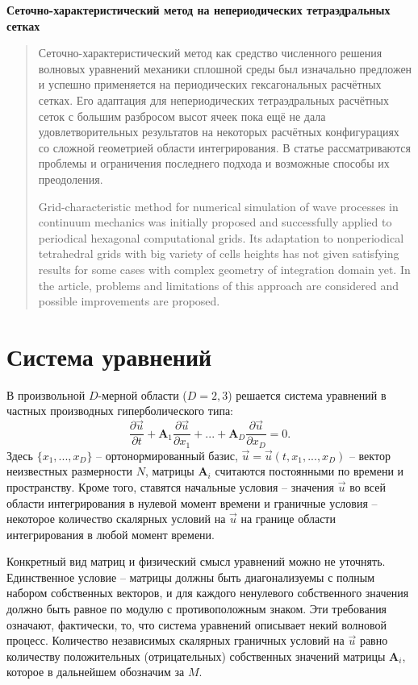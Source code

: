 \documentclass[a4paper]{article}
\numberwithin{equation}{section}
\begin{document}
\begin{center}
	\Large\textbf{{{Сеточно-характеристический метод на непериодических тетраэдральных сетках}}}
\end{center}

\begin{abstract}
Сеточно-характеристический метод как средство численного решения волновых уравнений 
механики сплошной среды был изначально предложен и успешно применяется на периодических 
гексагональных расчётных сетках. Его адаптация для непериодических тетраэдральных расчётных сеток 
с большим разбросом высот ячеек 
пока ещё не дала удовлетворительных результатов на некоторых  
расчётных конфигурациях со сложной геометрией области интегрирования. 
В статье рассматриваются проблемы и ограничения последнего подхода и возможные способы их преодоления.

Grid-characteristic method for numerical simulation of wave processes in continuum 
mechanics was initially proposed and successfully applied to periodical hexagonal 
computational grids. Its adaptation to nonperiodical tetrahedral grids 
with big variety of cells heights 
has not given satisfying results for some cases with complex geometry of 
integration domain yet. In the article, problems and limitations of this 
approach are considered and possible improvements are proposed.
\end{abstract}

\section{Система уравнений}
В произвольной $D$-мерной области ($D = 2, 3$) решается система уравнений 
в частных производных гиперболического типа:
\begin{equation}
\label{general_equation}
	\frac{\partial\vec{u}}{\partial{t}}+
	\mathbf{A}_1\frac{\partial\vec{u}}{\partial{x_1}}+...+
	\mathbf{A}_D\frac{\partial\vec{u}}{\partial{x_D}}=0.
\end{equation}
Здесь $\{x_1, ..., x_D\}$ -- ортонормированный базис, 
$\vec{u} = \vec{u}(t, x_1, ..., x_D)$ -- вектор неизвестных размерности $N$,
матрицы $\mathbf{A}_i$ считаются постоянными по времени и пространству.
Кроме того, ставятся начальные условия -- значения $\vec{u}$ 
во всей области интегрирования в нулевой момент времени и
граничные условия -- некоторое количество скалярных условий на $\vec{u}$ 
на границе области интегрирования в любой момент времени.

Конкретный вид матриц и физический смысл уравнений можно не уточнять. 
Единственное условие -- матрицы должны быть диагонализуемы с полным набором 
собственных векторов, и для каждого ненулевого собственного значения должно быть
равное по модулю с противоположным знаком. Эти требования означают, фактически,
то, что система уравнений описывает некий волновой процесс. Количество
независимых скалярных граничных условий на $\vec{u}$ равно количеству
положительных (отрицательных) собственных значений матрицы $\mathbf{A}_i$, 
которое в дальнейшем обозначим за $M$.
\end{document}

